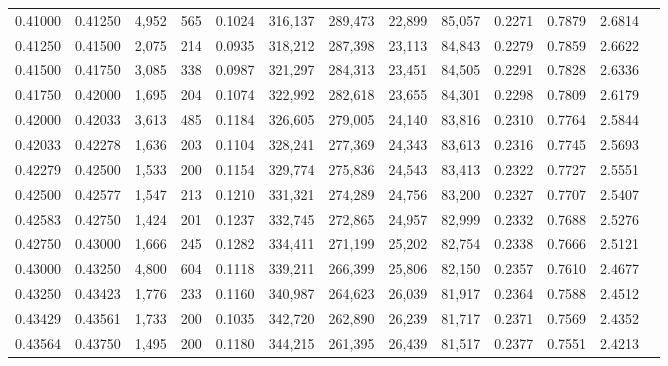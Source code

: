 \begin{tabular}{rrrrrrrrrrrrr}
0.41000 & 0.41250 & 4,952 & 565 &                                     0.1024 & 316,137 & 289,473 &  22,899 &  85,057 & 0.2271 & 0.7879 & 2.6814 \\
0.41250 & 0.41500 & 2,075 & 214 &                                     0.0935 & 318,212 & 287,398 &  23,113 &  84,843 & 0.2279 & 0.7859 & 2.6622 \\
0.41500 & 0.41750 & 3,085 & 338 &                                     0.0987 & 321,297 & 284,313 &  23,451 &  84,505 & 0.2291 & 0.7828 & 2.6336 \\
0.41750 & 0.42000 & 1,695 & 204 &                                     0.1074 & 322,992 & 282,618 &  23,655 &  84,301 & 0.2298 & 0.7809 & 2.6179 \\
0.42000 & 0.42033 & 3,613 & 485 &                                     0.1184 & 326,605 & 279,005 &  24,140 &  83,816 & 0.2310 & 0.7764 & 2.5844 \\
0.42033 & 0.42278 & 1,636 & 203 &                                     0.1104 & 328,241 & 277,369 &  24,343 &  83,613 & 0.2316 & 0.7745 & 2.5693 \\
0.42279 & 0.42500 & 1,533 & 200 &                                     0.1154 & 329,774 & 275,836 &  24,543 &  83,413 & 0.2322 & 0.7727 & 2.5551 \\
0.42500 & 0.42577 & 1,547 & 213 &                                     0.1210 & 331,321 & 274,289 &  24,756 &  83,200 & 0.2327 & 0.7707 & 2.5407 \\
0.42583 & 0.42750 & 1,424 & 201 &                                     0.1237 & 332,745 & 272,865 &  24,957 &  82,999 & 0.2332 & 0.7688 & 2.5276 \\
0.42750 & 0.43000 & 1,666 & 245 &                                     0.1282 & 334,411 & 271,199 &  25,202 &  82,754 & 0.2338 & 0.7666 & 2.5121 \\
0.43000 & 0.43250 & 4,800 & 604 &                                     0.1118 & 339,211 & 266,399 &  25,806 &  82,150 & 0.2357 & 0.7610 & 2.4677 \\
0.43250 & 0.43423 & 1,776 & 233 &                                     0.1160 & 340,987 & 264,623 &  26,039 &  81,917 & 0.2364 & 0.7588 & 2.4512 \\
0.43429 & 0.43561 & 1,733 & 200 &                                     0.1035 & 342,720 & 262,890 &  26,239 &  81,717 & 0.2371 & 0.7569 & 2.4352 \\
0.43564 & 0.43750 & 1,495 & 200 &                                     0.1180 & 344,215 & 261,395 &  26,439 &  81,517 & 0.2377 & 0.7551 & 2.4213 \\

\end{tabular}
